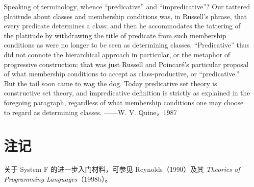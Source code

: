   {Speaking of terminology, whence ``predicative'' and ``impredicative''?
  Our tattered platitude about classes and membership conditions was, in
  Russell's phrase, that every predicate determines a class; and then he
  accommodates the tattering of the platitude by withdrawing the title of
  predicate from such membership conditions as were no longer to be seen as
  determining classes. ``Predicative'' thus did not connote the hierarchical
  approach in particular, or the metaphor of progressive construction; that
  was just Russell and Poincaré's particular proposal of what membership
  conditions to accept as class-productive, or ``predicative.'' But the tail
  soon came to wag the dog. Today predicative set theory is constructive set
  theory, and impredicative definition is strictly as explained in the
  foregoing paragraph, regardless of what membership conditions one may
  choose to regard as determining classes.}
  {——W. V. Quine，1987}

\section{注记}
\label{sec:23.11}

关于 System F 的进一步入门材料，可参见 Reynolds（1990）及其
\emph{Theories of Programming Languages}（1998b）。
